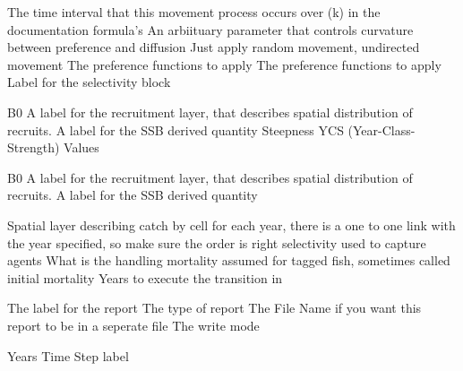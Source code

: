  {The time interval that this movement process occurs over (k) in the documentation formula's}
 {An arbiituary parameter that controls curvature between preference and diffusion}
 {Just apply random movement, undirected movement}
 {The preference functions to apply}
 {The preference functions to apply}
 {Label for the selectivity block}
\par\textbf{}\par
\par\textbf{}\par
{} {B0}
 {A label for the recruitment layer, that describes spatial distribution of recruits.}
 {A label for the SSB derived quantity}
 {Steepness}
 {YCS (Year-Class-Strength) Values}
\par\textbf{}\par
{} {B0}
 {A label for the recruitment layer, that describes spatial distribution of recruits.}
 {A label for the SSB derived quantity}
\par\textbf{}\par
{} {Spatial layer describing catch by cell for each year, there is a one to one link with the year specified, so make sure the order is right}
 {selectivity used to capture agents}
 {What is the handling mortality assumed for tagged fish, sometimes called initial mortality}
 {Years to execute the transition in}
\par\par
{} {The label for the report}
 {The type of report}
 {The File Name if you want this report to be in a seperate file}
 {The write mode}
\par\textbf{}\par
{} {Years}
 {Time Step label}
\par\textbf{}\par
